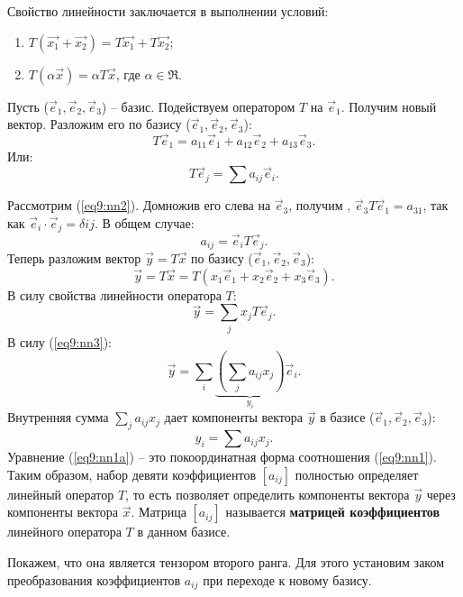 	Свойство линейности заключается в выполнении условий:
	\begin{enumerate}
		\item \( T(\vec{x_1} + \vec{x_2}) = T\vec{x_1} + T\vec{x_2} \);
		\item \( T(\alpha\vec{x}) = \alpha T\vec{x} \), где \( \alpha \in \Re \).
	\end{enumerate}
	
	Пусть (\( \vec{e}_1, \vec{e}_2, \vec{e}_3 \)) -- базис. Подействуем оператором \( T \) на \( \vec{e}_1 \). Получим новый вектор. Разложим его по базису (\( \vec{e}_1, \vec{e}_2, \vec{e}_3 \)):
	\begin{equation}
		T\vec{e}_1 = a_{11}\vec{e}_1 + a_{12}\vec{e}_2 + a_{13}\vec{e}_3. \label{eq9:nn2}
	\end{equation}
	Или:
	\begin{equation}
		T\vec{e}_j = \sum a_{ij}\vec{e}_i. \label{eq9:nn3}
	\end{equation}
	
	Рассмотрим (\ref{eq9:nn2}). Домножив его слева на \( \vec{e}_3 \), получим \( \), \( \vec{e}_3T\vec{e}_1 = a_{31} \), так как \( \vec{e}_i\cdot\vec{e}_j = \delta{ij} \). В общем случае:
	\begin{equation}
		a_{ij} = \vec{e}_iT\vec{e}_j. \label{eq9:nn4}
	\end{equation}
	Теперь разложим вектор \( \vec{y} = T\vec{x} \) по базису (\( \vec{e}_1, \vec{e}_2, \vec{e}_3 \)):
	\[ \vec{y} = T\vec{x} = T(x_1\vec{e}_1 + x_2\vec{e}_2 + x_3\vec{e}_3). \]
	В силу свойства линейности оператора \( T \):
	\[ \vec{y} = \sum\limits_j x_j T\vec{e}_j. \]
	В силу (\ref{eq9:nn3}):
	\[ \vec{y} =  \sum\limits_i\underbrace{(\sum\limits_j a_{ij}x_j)}_{y_i}\vec{e}_i. \]
	Внутренняя сумма \( \sum\limits_j a_{ij}x_j \) дает компоненты вектора \( \vec{y} \) в базисе (\( \vec{e}_1, \vec{e}_2, \vec{e}_3 \)):
	\begin{equation}
		y_i = \sum a_{ij}x_j. \label{eq9:nn1a}
	\end{equation}
	Уравнение (\ref{eq9:nn1a}) -- это покоординатная форма соотношения (\ref{eq9:nn1}).
	Таким образом, набор девяти коэффициентов \( [a_{ij}] \) полностью определяет линейный оператор \( T \), то есть позволяет определить компоненты вектора \( \vec{y} \) через компоненты вектора \( \vec{x} \). Матрица \( [a_{ij}] \) называется \textbf{матрицей коэффициентов} линейного оператора \( T \) в данном базисе.

	Покажем, что она является тензором второго ранга. Для этого установим заком преобразования коэффициентов \( a_{ij} \) при переходе к новому базису. 
	
